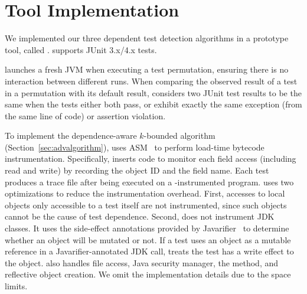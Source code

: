 \section{Tool Implementation}
\label{sec:impl}


We implemented our three dependent test detection algorithms in
a prototype tool, called \ourtool. \ourtool
supports JUnit 3.x/4.x tests. %

\ourtool launches a fresh JVM when
executing a test permutation, ensuring there is no interaction between
different runs. When comparing the observed result of
a test in a permutation with its default result,
\ourtool considers two JUnit test results to be the same when the
tests either both pass, or exhibit exactly the same exception
(from the same line of code) or assertion violation.

 

To implement the dependence-aware $k$-bounded algorithm (Section~\ref{sec:advalgorithm}),
\ourtool uses ASM~\cite{asm} to perform load-time bytecode
instrumentation. Specifically, \ourtool inserts code to monitor each
field access (including read and write) by recording the
object ID and the field name. Each test produces a trace file after being
executed on a \ourtool-instrumented program.
\ourtool uses two optimizations to reduce the
instrumentation overhead. First, accesses to local objects
only accessible to a test itself are not instrumented,
since such objects cannot
be the cause of test dependence. Second,
\ourtool does not instrument JDK classes. It uses the side-effect
annotations provided by Javarifier~\cite{QuinonezTE2008} to 
determine whether an object will be mutated or not.
If a test uses an object as a mutable reference
in a Javarifier-annotated JDK call, \ourtool treats the test
has a write effect to the object.
\ourtool also handles file access, Java security manager,
the  method, and reflective object creation.
We omit the implementation details due to the space limits.


